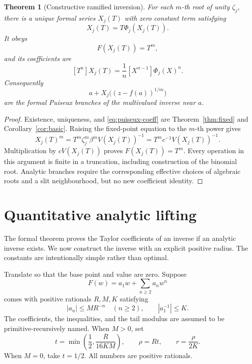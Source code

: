 \documentclass[11pt]{article}
\newtheorem{theorem}{Theorem}[section]
\theoremstyle{definition}
\begin{document}
\begin{theorem}[Constructive ramified inversion]\label{thm:puiseux}
For each \(m\)-th root of unity \(\zeta_j\), there is a unique formal series
\(X_j(T)\) with zero constant term satisfying
\[
 X_j(T)=T\Phi_j(X_j(T)).
\]
It obeys
\[
 F(X_j(T))=T^m,
\]
and its coefficients are
\begin{equation}\label{eq:puiseux-coeff}
 [T^n]X_j(T)=\frac1n[X^{n-1}]\Phi_j(X)^n.
\end{equation}
Consequently
\[
 a+X_j\bigl((z-f(a))^{1/m}\bigr)
\]
are the formal Puiseux branches of the multivalued inverse near \(a\).
\end{theorem}
\begin{proof}
Existence, uniqueness, and \eqref{eq:puiseux-coeff} are
Theorem~\ref{thm:fixed} and Corollary~\ref{cor:basic}.  Raising the fixed-point
equation to the \(m\)-th power gives
\[
 X_j(T)^m=T^m\zeta_j^m\beta^mV(X_j(T))^{-1}
 =T^m c^{-1}V(X_j(T))^{-1}.
\]
Multiplication by \(cV(X_j(T))\) proves \(F(X_j(T))=T^m\).  Every operation in
this argument is finite in a truncation, including construction of the
binomial root.  Analytic branches require the corresponding effective choices
of algebraic roots and a slit neighbourhood, but no new coefficient identity.
\end{proof}

\section{Quantitative analytic lifting}\label{sec:analytic}

The formal theorem proves the Taylor coefficients of an inverse if an analytic
inverse exists.  We now construct the inverse with an explicit positive radius.
The constants are intentionally simple rather than optimal.

Translate so that the base point and value are zero.  Suppose
\begin{equation}\label{eq:analytic-F}
 F(w)=a_1w+\sum_{n\ge2}a_nw^n
\end{equation}
comes with positive rationals \(R,M,K\) satisfying
\begin{equation}\label{eq:analytic-bounds}
 |a_n|\le MR^{-n}\quad(n\ge2),
 \qquad |a_1^{-1}|\le K.
\end{equation}
The coefficients, the inequalities, and the tail modulus are assumed to be
primitive-recursively named.  When \(M>0\), set
\begin{equation}\label{eq:radii}
 t=\min\left(\frac12,\frac{R}{16KM}\right),
 \qquad \rho=Rt,
 \qquad r=\frac{\rho}{2K}.
\end{equation}
When \(M=0\), take \(t=1/2\).  All numbers are positive rationals.
\end{document}
